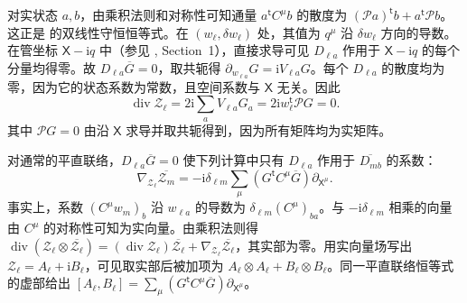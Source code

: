 对实状态 $a,b$，由乘积法则和对称性可知通量 $a^{\mathsf t}C^\mu b$ 的散度为 $(\mathcal P a)^{\mathsf t}b+a^{\mathsf t}\mathcal P b$。这正是 \cite{r-25} 的双线性守恒恒等式。在 $(w_\ell,\delta w_\ell)$ 处，其值为 $q^\mu$ 沿 $\delta w_\ell$ 方向的导数。在管坐标 $\mathsf X-\mathrm i q$ 中（参见 \cite{r-6}, Section~1），直接求导可见 $D_{\ell a}$ 作用于 $\mathsf X-\mathrm i q$ 的每个分量均得零。故 $D_{\ell a}\overline G=0$，取共轭得 $\partial_{w_{\ell a}}G=\mathrm i V_{\ell a}G$。每个 $D_{\ell a}$ 的散度均为零，因为它的状态系数为常数，且空间系数与 $\mathsf X$ 无关。因此
\[
\operatorname{div}\mathcal Z_\ell=2\mathrm i\sum_aV_{\ell a}G_a
=2\mathrm i w_\ell^{\mathsf t}\mathcal P G=0.
\]
其中 $\mathcal P G=0$ 由沿 $\mathsf X$ 求导并取共轭得到，因为所有矩阵均为实矩阵。

对通常的平直联络，$D_{\ell a}\overline G=0$ 使下列计算中只有 $D_{\ell a}$ 作用于 $\overline{D_{mb}}$ 的系数：
\[
\nabla_{\mathcal Z_\ell}\overline{\mathcal Z_m}
=-\mathrm i\delta_{\ell m}\sum_\mu(G^{\mathsf t}C^\mu\overline G)\partial_{\mathsf X^\mu}.
\]
事实上，系数 $(C^\mu w_m)_b$ 沿 $w_{\ell a}$ 的导数为 $\delta_{\ell m}(C^\mu)_{ba}$。与 $-\mathrm i\delta_{\ell m}$ 相乘的向量由 $C^\mu$ 的对称性可知为实向量。由乘积法则得 $\operatorname{div}(\mathcal Z_\ell\otimes\overline{\mathcal Z_\ell})=(\operatorname{div}\mathcal Z_\ell)\overline{\mathcal Z_\ell}+\nabla_{\mathcal Z_\ell}\overline{\mathcal Z_\ell}$，其实部为零。用实向量场写出 $\mathcal Z_\ell=A_\ell+\mathrm iB_\ell$，可见取实部后被加项为 $A_\ell\otimes A_\ell+B_\ell\otimes B_\ell$。同一平直联络恒等式的虚部给出 $[A_\ell,B_\ell]=\sum_\mu(G^{\mathsf t}C^\mu\overline G)\partial_{\mathsf X^\mu}$。
